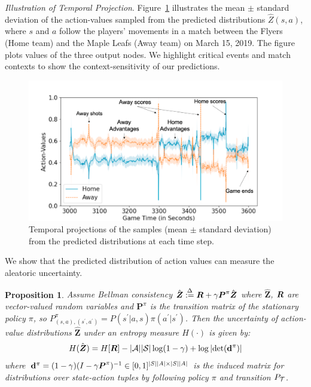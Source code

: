 \documentclass{article}
\newcommand{\state}{s}
\newcommand{\action}{a}
\newcommand{\reward}{r}
\newtheorem{proposition}{Proposition}
\begin{document}
{\it Illustration of Temporal Projection}. Figure~\ref{fig:temporal-plot} illustrates the mean $\pm$ standard deviation of the action-values sampled from the predicted distributions $\hat{Z}(\state,\action)$, where $\state$ and $\action$ follow the players' movements in a match between the Flyers (Home team) and the Maple Leafs (Away team) on March 15, 2019. The figure plots values
of the three output nodes. We highlight critical events and
match contexts to show the context-sensitivity of our predictions. 
\vspace{-0.15in}
\begin{figure}[htbp]
    \centering
    \includegraphics[scale=0.27]{figures/temporal-visualization-marked.png}
    \vspace{-0.25in}
    \caption{Temporal projections of the samples (mean $\pm$ standard deviation) from the predicted distributions at each time step.}
    \label{fig:temporal-plot}
    \vspace{-0.1in}
\end{figure}

We show that the predicted distribution of action values can measure the aleatoric uncertainty.

\begin{proposition}
Assume Bellman consistency  $\hat{\boldsymbol{Z}} \overset{\Delta}{:=} \MakeUppercase{\boldsymbol{\reward}} + \gamma \boldsymbol{P}^{\pi}\hat{\boldsymbol{Z}}$ 
where $\hat{\boldsymbol{Z}}$, $\boldsymbol{\MakeUppercase{\reward}}$ are vector-valued random variables and $\boldsymbol{P}^{\pi}$ is the transition matrix of the stationary policy $\pi$, so $P^{\pi}_{(\state,\action),(\state^{\prime},\action^{\prime})}=P(\state^{\prime}|\action,\state)\pi(\action^{\prime}|\state^{\prime})$. Then the uncertainty of action-value distributions $\hat{\boldsymbol{Z}}$ under an entropy measure $H(\cdot)$ is given by:
\begin{align}
    H(\hat{\boldsymbol{Z}}) = H[\boldsymbol{\MakeUppercase{\reward}}]-|\mathcal{\MakeUppercase{\action}}||\mathcal{\MakeUppercase{\state}}|\log(1-\gamma)+\log|\text{det}(\mathbf{d}^{\pi})|
\end{align}
where $\mathbf{d}^{\pi}=(1-\gamma)(I-\gamma \boldsymbol{P}^{\pi})^{-1}\in[0,1]^{|\MakeUppercase{\state}||\MakeUppercase{\action}|\times|\MakeUppercase{\state}||\MakeUppercase{\action}|}$ is the induced matrix for distributions over state-action tuples by following policy $\pi$ and transition $P_{\mathcal{\MakeUppercase{t}}}$. 
\end{proposition}
\end{document}
